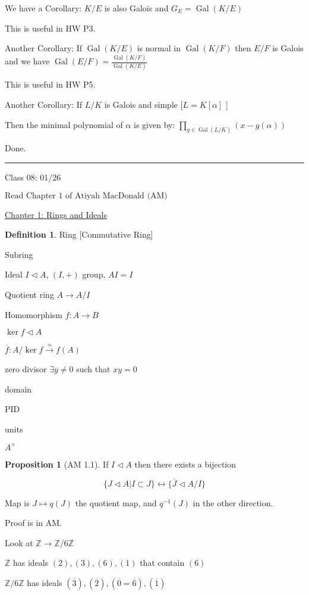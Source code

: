 \documentclass{article}
\theoremstyle{definition}
\newtheorem{definition}{Definition}
\newtheorem{proposition}{Proposition}
\begin{document}
We have a Corollary: \(K / E\) is also Galois and \(G_E = \operatorname{Gal}(K / E) \) 

This is useful in HW P3.

Another Corollary: If \(\operatorname{Gal}(K / E) \) is normal in \(\operatorname{Gal}(K / F) \) then \(E / F\) is Galois and we have \(\operatorname{Gal}(E / F) = \frac{\operatorname{Gal}(K / F)}{\operatorname{Gal}(K / E) }\) 

This is useful in HW P5.

Another Corollary: If \(L / K\) is Galois and simple [\(L = K[\alpha]\) ]

Then the minimal polynomial of \(\alpha\) is given by: \(\displaystyle \prod_{g\in \operatorname{Gal}(L / K) } (x - g(\alpha)) \)

Done.

\hfil
\hrule

Class 08: 01/26

\(\boxed{\text{Read Chapter 1 of Atiyah MacDonald (AM)}}\) 

\underline{Chapter 1: Rings and Ideals}

\begin{definition}

    Ring [Commutative Ring]
    
    Subring
    
    Ideal \(I \triangleleft A\), \((I,+)\) group, \(AI=I\) 
    
    Quotient ring \(A \to A/I\) 
    
    Homomorphism \(f:A\to B\) 
    
    \(\ker f \triangleleft A\) 
    
    \(\overline{f} : A / \ker f \overset{\simeq}{\longrightarrow} f(A)\)
    
    zero divisor \(\exists y \neq 0\) such that \(xy=0\) 

    domain

    PID

    units

    \(A^\times\) 
    
\end{definition}


\begin{proposition}
    [AM 1.1]

    If \(I \triangleleft A\) then there exists a bijection

    \[
        \{ J \triangleleft A \vert I \subset J \} \leftrightarrow \{ \overline{J} \triangleleft A / I \} 
    \]

    Map is \(J \mapsto q(J)\) the quotient map, and \(q^{-1}(J)\) in the other direction.

    Proof is in AM.

    Look at \(\mathbb{Z} \to \mathbb{Z} / 6 \mathbb{Z}\) 

    \(\mathbb{Z} \) has ideals \((2),(3),(6),(1)\) that contain \((6)\) 

    \(\mathbb{Z} / 6 \mathbb{Z} \) has ideals \((\overline{3} ), (\overline{2} ),(\overline{0}=\overline{6} ), (\overline{1} )\) 

\end{proposition}
\end{document}

